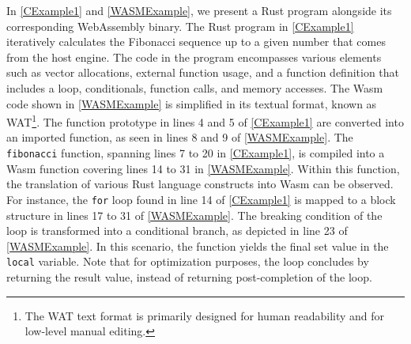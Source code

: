 In \autoref{CExample1} and \autoref{WASMExample}, we present a Rust program alongside its corresponding WebAssembly binary. 
The Rust program in \autoref{CExample1} iteratively calculates the Fibonacci sequence up to a given number that comes from the host engine.
The code in the program encompasses various elements such as vector allocations, external function usage, and a function definition that includes a loop, conditionals, function calls, and memory accesses.
The Wasm code shown in \autoref{WASMExample} is simplified in its textual format, known as WAT\footnote{The WAT text format is primarily designed for human readability and for low-level manual editing.}.
The function prototype in lines 4 and 5 of \autoref{CExample1} are converted into an imported function, as seen in lines 8 and 9 of \autoref{WASMExample}.
The \texttt{fibonacci} function, spanning lines 7 to 20 in \autoref{CExample1}, is compiled into a Wasm function covering lines 14 to 31 in \autoref{WASMExample}. Within this function, the translation of various Rust language constructs into Wasm can be observed.
For instance, the \texttt{for} loop found in line 14 of \autoref{CExample1} is mapped to a block structure in lines 17 to 31 of \autoref{WASMExample}. 
The breaking condition of the loop is transformed into a conditional branch, as depicted in line 23 of \autoref{WASMExample}. 
In this scenario, the function yields the final set value in the \texttt{local} variable. 
Note that for optimization purposes, the loop concludes by returning the result value, instead of returning post-completion of the loop.


\begin{minipage}[h]{0.9\textwidth}
    \begin{minipage}[t]{1.0\linewidth}
    
    \end{minipage}
\end{minipage}



